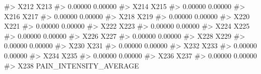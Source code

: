\documentclass[
  letterpaper,
]{krantz}
\makeatletter
\newenvironment{Shaded}{\begin{snugshade}}{\end{snugshade}}
\newcommand{\CommentTok}[1]{\textcolor[rgb]{0.37,0.37,0.37}{#1}}
\newenvironment{kframe}{%
\medskip{}
\setlength{\fboxsep}{.8em}
 \def\at@end@of@kframe{}%
 \ifinner\ifhmode%
  \def\at@end@of@kframe{\end{minipage}}%
  \begin{minipage}{\columnwidth}%
 \fi\fi%
 \def\FrameCommand##1{\hskip\@totalleftmargin \hskip-\fboxsep
 \colorbox{shadecolor}{##1}\hskip-\fboxsep
     \hskip-\linewidth \hskip-\@totalleftmargin \hskip\columnwidth}%
 \MakeFramed {\advance\hsize-\width
   \@totalleftmargin\z@ \linewidth\hsize
   \@setminipage}}%
 {\par\unskip\endMakeFramed%
 \at@end@of@kframe}
\renewenvironment{Shaded}{\begin{kframe}}{\end{kframe}}
\makeatother
\begin{document}
\begin{Shaded}
\begin{Highlighting}[]
\CommentTok{\#\textgreater{}                             X212                             X213 }
\CommentTok{\#\textgreater{}                          0.00000                          0.00000 }
\CommentTok{\#\textgreater{}                             X214                             X215 }
\CommentTok{\#\textgreater{}                          0.00000                          0.00000 }
\CommentTok{\#\textgreater{}                             X216                             X217 }
\CommentTok{\#\textgreater{}                          0.00000                          0.00000 }
\CommentTok{\#\textgreater{}                             X218                             X219 }
\CommentTok{\#\textgreater{}                          0.00000                          0.00000 }
\CommentTok{\#\textgreater{}                             X220                             X221 }
\CommentTok{\#\textgreater{}                          0.00000                          0.00000 }
\CommentTok{\#\textgreater{}                             X222                             X223 }
\CommentTok{\#\textgreater{}                          0.00000                          0.00000 }
\CommentTok{\#\textgreater{}                             X224                             X225 }
\CommentTok{\#\textgreater{}                          0.00000                          0.00000 }
\CommentTok{\#\textgreater{}                             X226                             X227 }
\CommentTok{\#\textgreater{}                          0.00000                          0.00000 }
\CommentTok{\#\textgreater{}                             X228                             X229 }
\CommentTok{\#\textgreater{}                          0.00000                          0.00000 }
\CommentTok{\#\textgreater{}                             X230                             X231 }
\CommentTok{\#\textgreater{}                          0.00000                          0.00000 }
\CommentTok{\#\textgreater{}                             X232                             X233 }
\CommentTok{\#\textgreater{}                          0.00000                          0.00000 }
\CommentTok{\#\textgreater{}                             X234                             X235 }
\CommentTok{\#\textgreater{}                          0.00000                          0.00000 }
\CommentTok{\#\textgreater{}                             X236                             X237 }
\CommentTok{\#\textgreater{}                          0.00000                          0.00000 }
\CommentTok{\#\textgreater{}                             X238           PAIN\_INTENSITY\_AVERAGE }

\end{Highlighting}
\end{Shaded}
\end{document}
